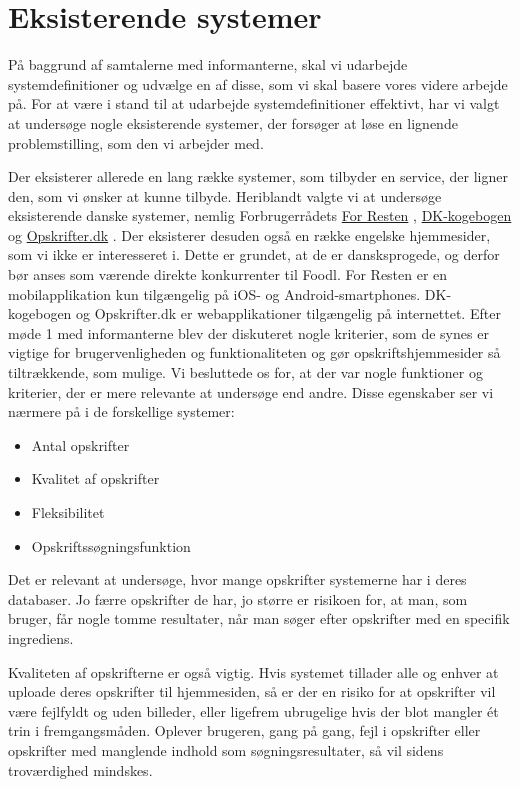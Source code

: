 \section{Eksisterende systemer}
\label{sec:eksisterendesystemer}

På baggrund af samtalerne med informanterne, skal vi udarbejde systemdefinitioner og udvælge en af disse, som vi skal basere vores videre arbejde på. For at være i stand til at udarbejde systemdefinitioner effektivt, har vi valgt at undersøge nogle eksisterende systemer, der forsøger at løse en lignende problemstilling, som den vi arbejder med.

Der eksisterer allerede en lang række systemer, som tilbyder en service, der ligner den, som vi ønsker at kunne tilbyde. Heriblandt valgte vi at undersøge  eksisterende danske systemer, nemlig Forbrugerrådets \href{https://play.google.com/store/apps/details?id=com.nodes.forresten}{For Resten} \cite{forresten}, \href{http://www.dk-kogebogen.dk/}{DK-kogebogen} \cite{dkkogebogen} og \href{http://opskrifter.dk/}{Opskrifter.dk} \cite{opskrifterdk}. Der eksisterer desuden også en række engelske hjemmesider, som vi ikke er interesseret i. Dette er grundet, at de er dansksprogede, og derfor bør anses som værende direkte konkurrenter til Foodl. For Resten er en mobilapplikation kun tilgængelig på iOS- og Android-smartphones. DK-kogebogen og Opskrifter.dk er webapplikationer tilgængelig på internettet. Efter møde 1 med informanterne blev der diskuteret nogle kriterier, som de synes er vigtige for brugervenligheden og funktionaliteten og gør opskriftshjemmesider så tiltrækkende, som mulige. Vi besluttede os for, at der var nogle funktioner og kriterier,  der er mere relevante at undersøge end andre. Disse egenskaber ser vi nærmere på i de forskellige systemer:

\begin{itemize}[noitemsep]
  \item Antal opskrifter
  \item Kvalitet af opskrifter
  \item Fleksibilitet
  \item Opskriftssøgningsfunktion
\end{itemize}

Det er relevant at undersøge, hvor mange opskrifter systemerne har i deres databaser. Jo færre opskrifter de har, jo større er risikoen for, at man, som bruger, får nogle tomme resultater, når man søger efter opskrifter med en specifik ingrediens. 

Kvaliteten af opskrifterne er også vigtig. Hvis systemet tillader alle og enhver at uploade deres opskrifter til hjemmesiden, så er der en risiko for at opskrifter vil være fejlfyldt og uden billeder, eller ligefrem ubrugelige hvis der blot mangler \'{e}t trin i fremgangsmåden. Oplever brugeren, gang på gang, fejl i opskrifter eller opskrifter med manglende indhold som søgningsresultater, så vil sidens troværdighed mindskes. 

